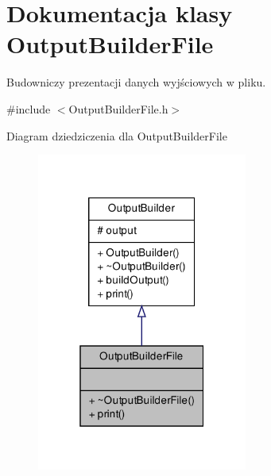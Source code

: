 \hypertarget{class_output_builder_file}{\section{\-Dokumentacja klasy \-Output\-Builder\-File}
\label{class_output_builder_file}
}


\-Budowniczy prezentacji danych wyjściowych w pliku.  




{\ttfamily \#include $<$\-Output\-Builder\-File.\-h$>$}



\-Diagram dziedziczenia dla \-Output\-Builder\-File\nopagebreak
\begin{figure}[H]
\begin{center}
\leavevmode
\includegraphics[width=196pt]{class_output_builder_file__inherit__graph}
\end{center}
\end{figure}


